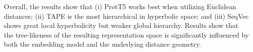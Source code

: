 \documentclass[]{Liebert_Author_revised}
\begin{document}
Overall, the results show that (i) ProtT5 works best when utilizing Euclidean distances; (ii) TAPE is the most hierarchical in hyperbolic space; and (iii) SeqVec shows great local hyperbolicity but weaker global hierarchy. Results show that the tree-likeness of the resulting representation space is significantly influenced by both the embedding model and the underlying distance geometry.





\end{document}
